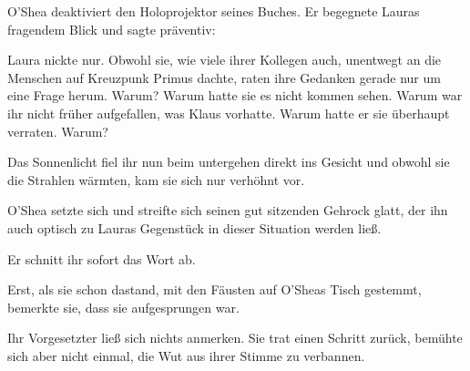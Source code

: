O'Shea deaktiviert den Holoprojektor seines Buches. Er begegnete Lauras fragendem Blick und sagte präventiv: 

\par

Laura nickte nur. Obwohl sie, wie viele ihrer Kollegen auch, unentwegt an die Menschen auf Kreuzpunk Primus dachte, raten ihre Gedanken gerade nur um eine Frage herum. Warum? Warum hatte sie es nicht kommen sehen. Warum war ihr nicht früher aufgefallen, was Klaus vorhatte. Warum hatte er sie überhaupt verraten. Warum?

\par

Das Sonnenlicht fiel ihr nun beim untergehen direkt ins Gesicht und obwohl sie die Strahlen wärmten, kam sie sich nur verhöhnt vor.

\par

 O'Shea setzte sich und streifte sich seinen gut sitzenden Gehrock glatt, der ihn auch optisch zu Lauras Gegenstück in dieser Situation werden ließ. 

\par


\par

Er schnitt ihr sofort das Wort ab. 

\par

 Erst, als sie schon dastand, mit den Fäusten auf O'Sheas Tisch gestemmt, bemerkte sie, dass sie aufgesprungen war.

\par

Ihr Vorgesetzter ließ sich nichts anmerken. Sie trat einen Schritt zurück, bemühte sich aber nicht einmal, die Wut aus ihrer Stimme zu verbannen. 

